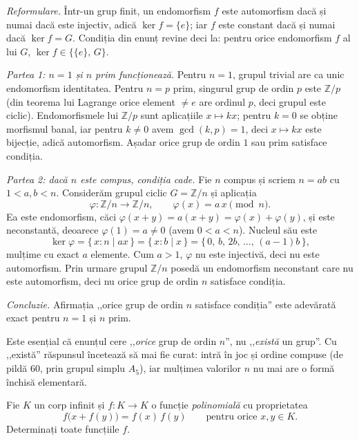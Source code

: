 \begin{solutie}
\textit{Reformulare.} Într-un grup finit, un endomorfism $f$ este
automorfism dacă și numai dacă este injectiv, adică
$\ker f=\{e\}$; iar $f$ este constant dacă și numai dacă
$\ker f=G$. Condiția din enunț revine deci la: pentru orice
endomorfism $f$ al lui $G$, $\ker f \in \{\{e\},\,G\}$.

\smallskip
\textit{Partea 1: $n=1$ și $n$ prim funcționează.}
Pentru $n=1$, grupul trivial are ca unic endomorfism identitatea. Pentru
$n=p$ prim, singurul grup de ordin $p$ este $\mathbb{Z}/p$ (din teorema lui
Lagrange orice element $\neq e$ are ordinul $p$, deci grupul este ciclic).
Endomorfismele lui $\mathbb{Z}/p$ sunt aplicațiile $x \mapsto kx$; pentru
$k=0$ se obține morfismul banal, iar pentru $k \neq 0$ avem
$\gcd(k,p)=1$, deci $x \mapsto kx$ este bijecție, adică automorfism.
Așadar orice grup de ordin $1$ sau prim satisface condiția.

\smallskip
\textit{Partea 2: dacă $n$ este compus, condiția cade.}
Fie $n$ compus și scriem $n=ab$ cu $1<a,b<n$. Considerăm grupul
ciclic $G=\mathbb{Z}/n$ și aplicația
\[
  \varphi : \mathbb{Z}/n \to \mathbb{Z}/n, \qquad \varphi(x)=a\,x \pmod n.
\]
Ea este endomorfism, căci $\varphi(x+y)=a(x+y)=\varphi(x)+\varphi(y)$, și
este neconstantă, deoarece $\varphi(1)=a \neq 0$ (avem $0<a<n$).
Nucleul său este
\[
  \ker\varphi = \{\, x : n \mid ax \,\}
              = \{\, x : b \mid x \,\}
              = \{\, 0,\, b,\, 2b,\, \dots,\, (a-1)b \,\},
\]
mulțime cu exact $a$ elemente. Cum $a>1$, $\varphi$ nu este injectivă,
deci nu este automorfism. Prin urmare grupul $\mathbb{Z}/n$ posedă un
endomorfism neconstant care nu este automorfism, deci nu orice grup de
ordin $n$ satisface condiția.

\smallskip
\textit{Concluzie.} Afirmația ,,orice grup de ordin $n$ satisface
condiția'' este adevărată exact pentru $n=1$ și $n$ prim.
\end{solutie}

\begin{obs}
Este esențial că enunțul cere ,,\emph{orice} grup de ordin
$n$'', nu ,,\emph{există} un grup''. Cu ,,există'' răspunsul
încetează să mai fie curat: intră în joc și ordine
compuse (de pildă $60$, prin grupul simplu $A_{5}$), iar mulțimea
valorilor $n$ nu mai are o formă închisă elementară.
\end{obs}

\begin{problema}
Fie $K$ un corp infinit și $f : K \to K$ o funcție
\emph{polinomială} cu proprietatea
\[
  f\bigl(x+f(y)\bigr) = f(x)\,f(y) \qquad \text{pentru orice } x,y \in K .
\]
Determinați toate funcțiile $f$.
\end{problema}


